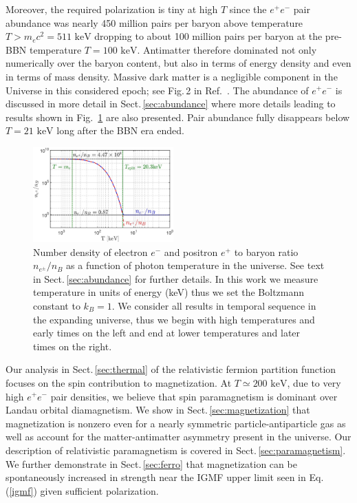 \documentclass[aps,prd,floatfix,reprint]{revtex4-2}
\newcommand*{\keV}{\text{ keV}}
\newcommand{\req}[1]{Eq.\,(\ref{#1})}
\newcommand{\rf}[1]{Fig.~{\ref{#1}}}
\newcommand{\rsec}[1]{Sect.\,{\ref{#1}}}
\begin{document}
Moreover, the required polarization is tiny at high $T$ since the $e^{+}e^{-}$ pair abundance was nearly 450 million pairs per baryon above temperature $T>m_ec^2=511\keV$ dropping to about 100 million pairs per baryon at the pre-BBN temperature $T=100\keV$. Antimatter therefore dominated not only numerically over the baryon content, but also in terms of energy density and even in terms of mass density. Massive dark matter is a negligible component in the Universe in this considered epoch; see Fig.\,2 in Ref.~\cite{Rafelski:2023emw}. The abundance of $e^{+}e^{-}$  is discussed in more detail in \rsec{sec:abundance} where more details leading to results shown in \rf{fig:densityratio} are also presented. Pair abundance fully disappears below  $T=21\keV$ long after the BBN era ended. 

\begin{figure}[ht]
 \centering
\includegraphics[width=0.48\textwidth]{plots/EEPlasmaDensityRatio_new01.jpg}
 \caption{Number density of electron $e^{-}$ and positron $e^{+}$ to baryon ratio $n_{e^{\pm}}/n_{B}$ as a function of photon temperature in the universe. See text in \rsec{sec:abundance} for further details. In this work we measure temperature in units of energy (keV) thus we set the Boltzmann constant to $k_{B}=1$. We consider all results in temporal sequence in the expanding universe, thus we begin with high temperatures and early times on the left and end at lower temperatures and later times on the right.}
 \label{fig:densityratio} 
\end{figure}

Our analysis in \rsec{sec:thermal} of the relativistic fermion partition function focuses on the spin contribution to magnetization. At $T\simeq200\keV$, due to very high $e^{+}e^{-}$ pair densities, we believe that spin paramagnetism is dominant over Landau orbital diamagnetism. We show in \rsec{sec:magnetization} that magnetization is nonzero even for a nearly symmetric particle-antiparticle gas as well as account for the matter-antimatter asymmetry present in the universe. Our description of relativistic paramagnetism is covered in \rsec{sec:paramagnetism}. We further demonstrate in \rsec{sec:ferro} that magnetization can be spontaneously increased in strength near the IGMF upper limit seen in \req{igmf} given sufficient polarization.
\end{document}
